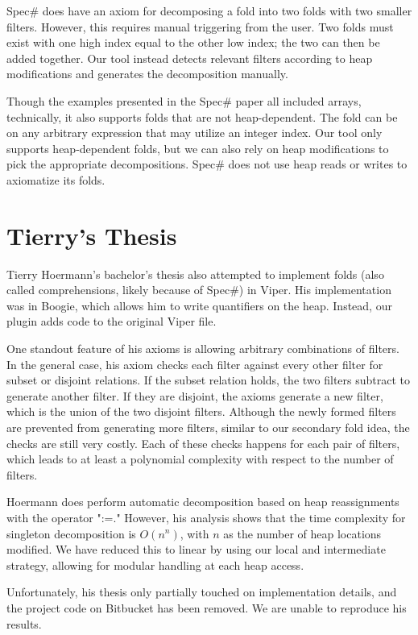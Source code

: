 \documentclass[msc,oneside]{ubcthesis}
\theoremstyle{definition}
\begin{document}
Spec\# does have an axiom for decomposing a fold into two folds with two smaller filters. However, this requires manual triggering from the user. Two folds must exist with one high index equal to the other low index; the two can then be added together. Our tool instead detects relevant filters according to heap modifications and generates the decomposition manually.    

Though the examples presented in the Spec\# paper all included arrays, technically, it also supports folds that are not heap-dependent. The fold can be on any arbitrary expression that may utilize an integer index. Our tool only supports heap-dependent folds, but we can also rely on heap modifications to pick the appropriate decompositions. Spec\# does not use heap reads or writes to axiomatize its folds.

\section{Tierry's Thesis}
Tierry Hoermann's bachelor’s thesis also attempted to implement folds (also called comprehensions, likely because of Spec\#) in Viper. His implementation was in Boogie, which allows him to write quantifiers on the heap. Instead, our plugin adds code to the original Viper file. 

One standout feature of his axioms is allowing arbitrary combinations of filters. In the general case, his axiom checks each filter against every other filter for subset or disjoint relations. If the subset relation holds, the two filters subtract to generate another filter. If they are disjoint, the axioms generate a new filter, which is the union of the two disjoint filters. Although the newly formed filters are prevented from generating more filters, similar to our secondary fold idea, the checks are still very costly. Each of these checks happens for each pair of filters, which leads to at least a polynomial complexity with respect to the number of filters.

Hoermann does perform automatic decomposition based on heap reassignments with the operator ":=." However, his analysis shows that the time complexity for singleton decomposition is $O(n^n)$, with $n$ as the number of heap locations modified. We have reduced this to linear by using our local and intermediate strategy, allowing for modular handling at each heap access. 

Unfortunately, his thesis only partially touched on implementation details, and the project code on Bitbucket has been removed. We are unable to reproduce his results.
\end{document}
